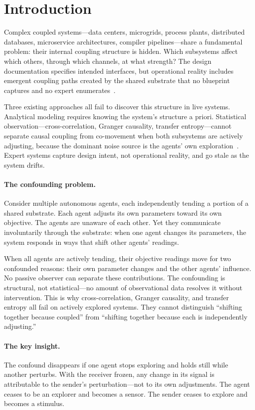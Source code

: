 \section{Introduction}
\label{sec:introduction}

Complex coupled systems---data centers, microgrids, process plants,
distributed databases, microservice architectures, compiler
pipelines---share a fundamental problem: their internal coupling
structure is hidden. Which subsystems affect which others,
through which channels, at what strength? The design documentation
specifies intended interfaces, but operational reality includes
emergent coupling paths created by the shared substrate that no
blueprint captures and no expert enumerates~\citep{ljung1999sid}.

Three existing approaches all fail to discover this structure in live
systems. Analytical modeling requires knowing the system's structure
a priori. Statistical observation---cross-correlation, Granger
causality, transfer entropy---cannot separate causal coupling from
co-movement when both subsystems are actively adjusting, because the
dominant noise source is the agents' own
exploration~\citep{sugihara2012ccm, runge2018confounding}. Expert
systems capture design intent, not operational reality, and go stale
as the system drifts.

\paragraph{The confounding problem.}
Consider multiple autonomous agents, each independently tending a
portion of a shared substrate. Each agent adjusts its own parameters
toward its own objective. The agents are unaware of each other.
Yet they communicate involuntarily through the substrate: when one
agent changes its parameters, the system responds in ways
that shift other agents' readings.

When all agents are actively tending, their objective readings move
for two confounded reasons: their own parameter changes and the other
agents' influence. No passive observer can separate these
contributions. The confounding is structural, not statistical---no
amount of observational data resolves it without intervention. This
is why cross-correlation, Granger causality, and transfer entropy all
fail on actively explored systems. They cannot distinguish ``shifting
together because coupled'' from ``shifting together because each is
independently adjusting.''

\paragraph{The key insight.}
The confound disappears if one agent stops exploring and holds still
while another perturbs. With the receiver frozen, any change in its
signal is attributable to the sender's perturbation---not to its own
adjustments. The agent ceases to be an explorer and becomes a
sensor. The sender ceases to explore and becomes a stimulus.

